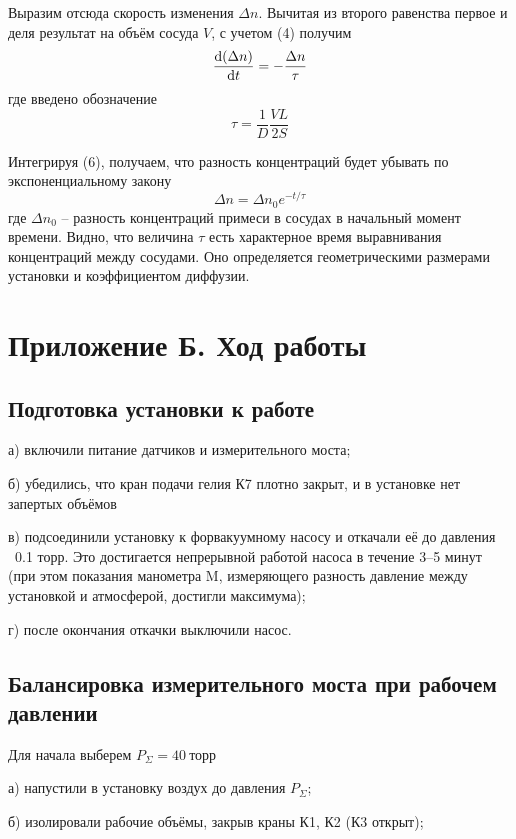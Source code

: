 Выразим отсюда скорость изменения $\Delta n$. Вычитая из второго равенства первое и деля результат на объём сосуда $V$, с учетом (4) получим
\begin{equation}
\dv{(\Delta n)}{t} = -\frac{\Delta n}{\tau}
\end{equation}
где введено обозначение
\begin{equation}
\tau = \frac{1}{D} \frac{VL}{2S}
\end{equation}

Интегрируя (6), получаем, что разность концентраций будет убывать по экспоненциальному закону
\begin{equation}
\Delta n = \Delta n_0 e^{-t/\tau}
\end{equation}
где $\Delta n_0$ -- разность концентраций примеси в сосудах в начальный момент времени. Видно, что величина $\tau$ есть характерное время выравнивания концентраций между сосудами. Оно определяется геометрическими размерами установки и коэффициентом диффузии.

\section{Приложение Б. Ход работы}
    
\subsection{Подготовка установки к работе}
а) включили питание датчиков и измерительного моста;

б) убедились, что кран подачи гелия К7 плотно закрыт, и в установке нет
запертых объёмов

в) подсоединили установку к форвакуумному насосу и откачали её до давления
~0.1 торр. Это достигается непрерывной работой насоса в течение
3–5 минут (при этом показания манометра M, измеряющего разность
давление между установкой и атмосферой, достигли максимума);

г) после окончания откачки выключили насос.

\subsection{Балансировка измерительного моста при рабочем давлении}

Для начала выберем $P_{\Sigma} = 40~\text{торр}$

а) напустили в установку воздух до давления $P_{\Sigma}$;

б) изолировали рабочие объёмы, закрыв краны К1, К2 (К3 открыт);

